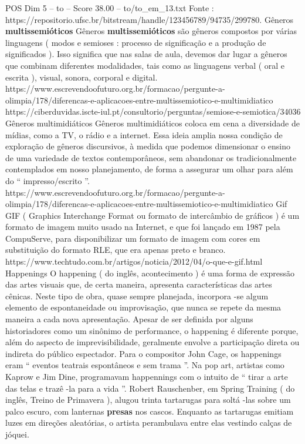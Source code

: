 \begin{textsample}{POS Dim 5 – to – Score 38.00 – to/to\_em\_13.txt}
Fonte : https://repositorio.ufsc.br/bitstream/handle/123456789/94735/299780.
Gêneros \textbf{multissemióticos} Gêneros \textbf{multissemióticos} são gêneros compostos por várias linguagens ( modos e semioses : processo de significação e a produção de significados ).
Isso significa que nas salas de aula, devemos dar lugar a gêneros que combinam diferentes modalidades, tais como as linguagens verbal ( oral e escrita ), visual, sonora, corporal e digital. https://www.escrevendoofuturo.org.br/formacao/pergunte-a-olimpia/178/diferencas-e-aplicacoes-entre-multissemiotico-e-multimidiatico https://ciberduvidas.iscte-iul.pt/consultorio/perguntas/semiose-e-semiotica/34036 Gêneros multimidiáticos Gêneros multimidiáticos coloca em cena a diversidade de mídias, como a TV, o rádio e a internet.
Essa ideia amplia nossa condição de exploração de gêneros discursivos, à medida que podemos dimensionar o ensino de uma variedade de textos contemporâneos, sem abandonar os tradicionalmente contemplados em nosso planejamento, de forma a assegurar um olhar para além do “ impresso/escrito ”. https://www.escrevendoofuturo.org.br/formacao/pergunte-a-olimpia/178/diferencas-e-aplicacoes-entre-multissemiotico-e-multimidiatico Gif GIF ( Graphics Interchange Format ou formato de intercâmbio de gráficos ) é um formato de imagem muito usado na Internet, e que foi lançado em 1987 pela CompuServe, para disponibilizar um formato de imagem com cores em substituição do formato RLE, que era apenas preto e branco. https://www.techtudo.com.br/artigos/noticia/2012/04/o-que-e-gif.html Happenings O happening ( do inglês, acontecimento ) é uma forma de expressão das artes visuais que, de certa maneira, apresenta características das artes cênicas.
Neste tipo de obra, quase sempre planejada, incorpora -se algum elemento de espontaneidade ou improvisação, que nunca se repete da mesma maneira a cada nova apresentação.
Apesar de ser definida por alguns historiadores como um sinônimo de performance, o happening é diferente porque, além do aspecto de imprevisibilidade, geralmente envolve a participação direta ou indireta do público espectador.
Para o compositor John Cage, os happenings eram “ eventos teatrais espontâneos e sem trama ”.
Na pop art, artistas como Kaprow e Jim Dine, programavam happennings com o intuito de “ tirar a arte das telas e trazê -la para a vida ”.
Robert Rauschenber, em Spring Training ( do inglês, Treino de Primavera ), alugou trinta tartarugas para soltá -las sobre um palco escuro, com lanternas \textbf{presas} nos cascos.
Enquanto as tartarugas emitiam luzes em direções aleatórias, o artista perambulava entre elas vestindo calças de jóquei.

\end{textsample}
